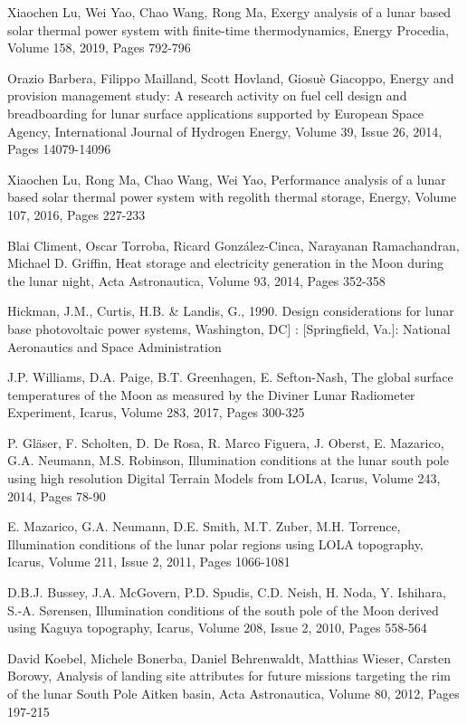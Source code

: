 \documentclass[prl,onecolumn]{revtex4-1}  %
\begin{document}
\begin{thebibliography}{99}
Xiaochen Lu, Wei Yao, Chao Wang, Rong Ma,
Exergy analysis of a lunar based solar thermal power system with finite-time thermodynamics,
Energy Procedia,
Volume 158,
2019,
Pages 792-796


Orazio Barbera, Filippo Mailland, Scott Hovland, Giosuè Giacoppo,
Energy and provision management study: A research activity on fuel cell design and breadboarding for lunar surface applications supported by European Space Agency,
International Journal of Hydrogen Energy,
Volume 39, Issue 26,
2014,
Pages 14079-14096

Xiaochen Lu, Rong Ma, Chao Wang, Wei Yao,
Performance analysis of a lunar based solar thermal power system with regolith thermal storage,
Energy,
Volume 107,
2016,
Pages 227-233

Blai Climent, Oscar Torroba, Ricard González-Cinca, Narayanan Ramachandran, Michael D. Griffin,
Heat storage and electricity generation in the Moon during the lunar night,
Acta Astronautica,
Volume 93,
2014,
Pages 352-358

Hickman, J.M., Curtis, H.B. \& Landis, G., 1990. Design considerations for lunar base photovoltaic power systems, Washington, DC] : [Springfield, Va.]: National Aeronautics and Space Administration


J.P. Williams, D.A. Paige, B.T. Greenhagen, E. Sefton-Nash,
The global surface temperatures of the Moon as measured by the Diviner Lunar Radiometer Experiment,
Icarus,
Volume 283,
2017,
Pages 300-325


P. Gl{\"a}ser, F. Scholten, D. De Rosa, R. Marco Figuera, J. Oberst, E. Mazarico, G.A. Neumann, M.S. Robinson,
Illumination conditions at the lunar south pole using high resolution Digital Terrain Models from LOLA,
Icarus,
Volume 243,
2014,
Pages 78-90


E. Mazarico, G.A. Neumann, D.E. Smith, M.T. Zuber, M.H. Torrence,
Illumination conditions of the lunar polar regions using LOLA topography,
Icarus,
Volume 211, Issue 2,
2011,
Pages 1066-1081


D.B.J. Bussey, J.A. McGovern, P.D. Spudis, C.D. Neish, H. Noda, Y. Ishihara, S.-A. Sørensen,
Illumination conditions of the south pole of the Moon derived using Kaguya topography,
Icarus,
Volume 208, Issue 2,
2010,
Pages 558-564


David Koebel, Michele Bonerba, Daniel Behrenwaldt, Matthias Wieser, Carsten Borowy,
Analysis of landing site attributes for future missions targeting the rim of the lunar South Pole Aitken basin,
Acta Astronautica,
Volume 80,
2012,
Pages 197-215


\end{thebibliography}
\end{document}
